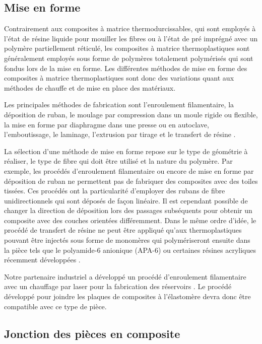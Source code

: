 \subsection{Mise en forme}

Contrairement aux composites à matrice thermodurcissables, qui sont employés à l'état de résine liquide pour mouiller les fibres ou à l'état de pré imprégné avec un polymère partiellement réticulé, les composites à matrice thermoplastiques sont généralement employés sous forme de polymères totalement polymérisés qui sont fondus lors de la mise en forme. 
Les différentes méthodes de mise en forme des composites à matrice thermoplastiques sont donc des variations quant aux méthodes de chauffe et de mise en place des matériaux. 

Les principales méthodes de fabrication sont l'enroulement filamentaire, la déposition de ruban, le moulage par compression dans un moule rigide ou flexible, la mise en forme par diaphragme dans une presse ou en autoclave, l'emboutissage, le laminage, l'extrusion par tirage et le transfert de résine \cite{asmhandbook21, campbell2003}.  

La sélection d'une méthode de mise en forme repose sur le type de géométrie à réaliser, le type de fibre qui doit être utilisé et la nature du polymère. 
Par exemple, les procédés d'enroulement filamentaire ou encore de mise en forme par déposition de ruban ne permettent pas de fabriquer des composites avec des toiles tissées. 
Ces procédés ont la particularité d'employer des rubans de fibre unidirectionnels qui sont déposés de façon linéaire. 
Il est cependant possible de changer la direction de déposition lors des passages subséquents pour obtenir un composite avec des couches orientées différemment. 
Dans le même ordre d'idée, le procédé de transfert de résine ne peut être appliqué qu'aux thermoplastiques pouvant être injectés sous forme de monomères qui polymériseront ensuite dans la pièce tels que le polyamide-6 anionique (APA-6) \cite{Rijswijk2006} ou certaines résines acryliques récemment développées \cite{Penumadu2019,Murray2019}. 

Notre partenaire industriel a développé un procédé d'enroulement filamentaire avec un chauffage par laser pour la fabrication des réservoirs \cite{Krzeminski2014}. 
Le procédé développé pour joindre les plaques de composites à l'élastomère devra donc être compatible avec ce type de pièce. 

\subsection{Jonction des pièces en composite}

